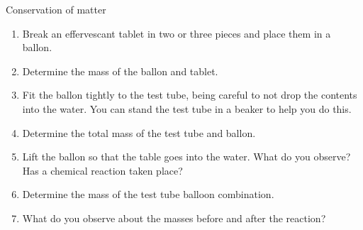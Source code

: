 \begin{i_experiment}{Conservation of matter}
\begin{minipage}{.6\textwidth}
\begin{enumerate}[noitemsep, label=\textbf{\arabic*}. ]
\item Break an effervescant tablet in two or three pieces and place them in a ballon.
\item Determine the mass of the ballon and tablet.
\item Fit the ballon tightly to the test tube, being careful to not drop the contents into the water. You can stand the test tube in a beaker to help you do this.
\item Determine the total mass of the test tube and ballon.
\item Lift the ballon so that the table goes into the water. What do you observe? Has a chemical reaction taken place?
\item Determine the mass of the test tube balloon combination.
\item What do you observe about the masses before and after the reaction?
\end{enumerate}
\end{minipage}
\begin{minipage}{.4\textwidth}
 \begin{center}
\end{center}
\end{minipage}
\end{i_experiment}
